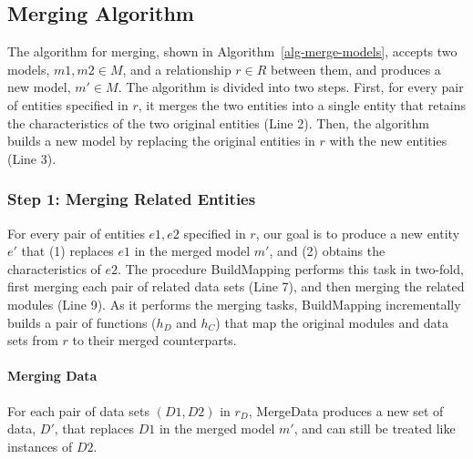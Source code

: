 \subsection{Merging Algorithm}

The algorithm for merging, shown in Algorithm~\ref{alg-merge-models},
accepts two models, $m1, m2 \in M$, and a relationship $r \in R$
between them, and produces a new model, $m' \in M$. The algorithm is
divided into two steps. First, for every pair of entities specified in
$r$, it merges the two entities into a single entity that retains the
characteristics of the two original entities (Line 2). Then, the
algorithm builds a new model by replacing the original entities in
$r$ with the new entities (Line 3).


\subsubsection{Step 1: Merging Related Entities}

For every pair of entities $e1, e2$ specified in $r$, our goal is to
produce a new entity $e'$ that (1) replaces $e1$ in the merged model
$m'$, and (2) obtains the characteristics of $e2$. The procedure
\textsf{BuildMapping} performs this task in two-fold, first merging
each pair of related data sets (Line 7), and then merging the related
modules (Line 9). As it performs the merging tasks,
\textsf{BuildMapping} incrementally builds a pair of functions
($h_{D}$ and $h_{C}$) that map the original modules and data sets from
$r$ to their merged counterparts.


\paragraph{\textbf{Merging Data}} For each pair of data sets $(D1,
D2)$ in $r_{D}$, \textsf{MergeData} produces a new set of data, $D'$,
that replaces $D1$ in the merged model $m'$, and can still be treated
like instances of $D2$. 

